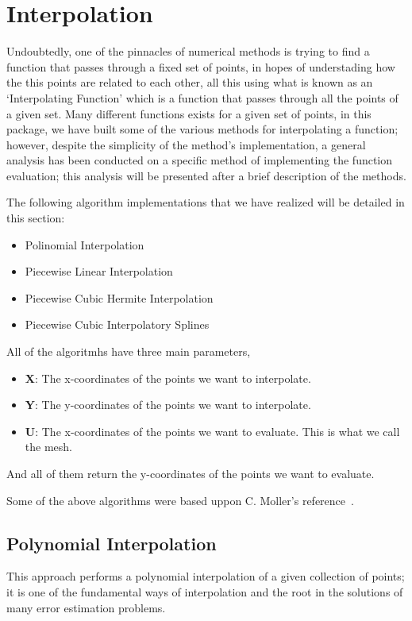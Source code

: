 \section{Interpolation}
Undoubtedly, one of the pinnacles of numerical methods is trying to find a function that passes through a fixed set of points, in hopes of understading how the this points are related to each other, all this using what is known as an `Interpolating Function' which is a function that passes through all the points of a given set. Many different functions exists for a given set of points, in this package, we have built some of the various methods for interpolating a function; however, despite the simplicity of the method's implementation, a general analysis has been conducted on a specific method of implementing the function evaluation; this analysis will be presented after a brief description of the methods.

The following algorithm implementations that we have realized will be detailed in this section:
\begin{itemize}
    \item Polinomial Interpolation 
    \item Piecewise Linear Interpolation 
    \item Piecewise Cubic Hermite Interpolation 
    \item Piecewise Cubic Interpolatory Splines 
\end{itemize}

All of the algoritmhs have three main parameters, 
\begin{itemize}
    \item \textbf{X}: The x-coordinates of the points we want to interpolate.
    \item \textbf{Y}: The y-coordinates of the points we want to interpolate.
    \item \textbf{U}: The x-coordinates of the points we want to evaluate. This is what we call the mesh.
\end{itemize}
And all of them return the y-coordinates of the points we want to evaluate.

Some of the above algorithms were based uppon C. Moller's reference~\cite{doi:10.1137/1.9780898717952}.

\subsection{Polynomial Interpolation}
This approach performs a polynomial interpolation of a given collection of points; it is one of the fundamental ways of interpolation and the root in the solutions of many error estimation problems. 

